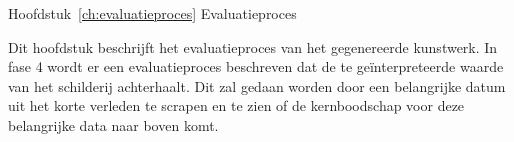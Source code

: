 Hoofdstuk~\ref{ch:evaluatieproces} Evaluatieproces

Dit hoofdstuk beschrijft het evaluatieproces van het gegenereerde kunstwerk. In fase 4 wordt er een evaluatieproces beschreven dat de te geïnterpreteerde waarde van het schilderij achterhaalt. Dit zal gedaan worden door een belangrijke datum uit het korte verleden te scrapen en te zien of de kernboodschap voor deze belangrijke data naar boven komt. 



